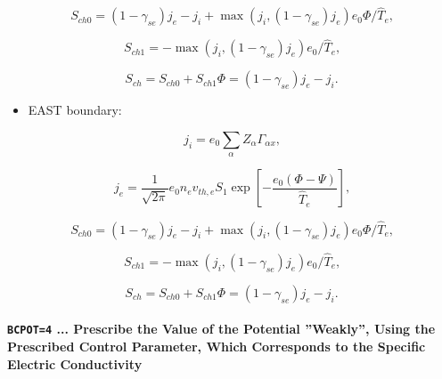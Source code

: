\documentclass[11pt]{article}
\begin{document}
\begin{equation}
S_{ch0}=\left( 1-\gamma_{se}\right) j_{e}-j_{i}+\max\left( j_{i},\left(
1-\gamma_{se}\right) j_{e}\right) e_{0}\Phi/\widehat{T}_{e}\text{,} 
\label{c316}
\end{equation}

\begin{equation}
S_{ch1}=-\max\left( j_{i},\left( 1-\gamma_{se}\right) j_{e}\right) e_{0}/%
\widehat{T}_{e}\text{,}   \label{c317}
\end{equation}

\begin{equation}
S_{ch}=S_{ch0}+S_{ch1}\Phi=\left( 1-\gamma_{se}\right) j_{e}-j_{i}\text{.} 
\label{c318}
\end{equation}

\bigskip

\begin{itemize}
\item  EAST boundary:
\end{itemize}

\begin{equation}
j_{i}=e_{0}\sum_{\alpha}Z_{\alpha}\Gamma_{\alpha x}\text{,}   \label{c319}
\end{equation}

\begin{equation}
j_{e}=\frac{1}{\sqrt{2\pi}}e_{0}n_{e}v_{th,e}S_{1}\exp\left[ -\frac
{e_{0}\left( \Phi-\Psi\right) }{\widehat{T}_{e}}\right] \text{,} 
\label{c320}
\end{equation}

\begin{equation}
S_{ch0}=\left( 1-\gamma_{se}\right) j_{e}-j_{i}+\max\left( j_{i},\left(
1-\gamma_{se}\right) j_{e}\right) e_{0}\Phi/\widehat{T}_{e}\text{,} 
\label{c321}
\end{equation}

\begin{equation}
S_{ch1}=-\max\left( j_{i},\left( 1-\gamma_{se}\right) j_{e}\right) e_{0}/%
\widehat{T}_{e}\text{,}   \label{c322}
\end{equation}

\begin{equation}
S_{ch}=S_{ch0}+S_{ch1}\Phi=\left( 1-\gamma_{se}\right) j_{e}-j_{i}\text{.} 
\label{c323}
\end{equation}

\bigskip

\bigskip

\paragraph{\texttt{BCPOT=4} ... Prescribe the Value of the Potential
''Weakly'', Using the Prescribed Control Parameter, Which Corresponds to the
Specific Electric Conductivity}
\end{document}
